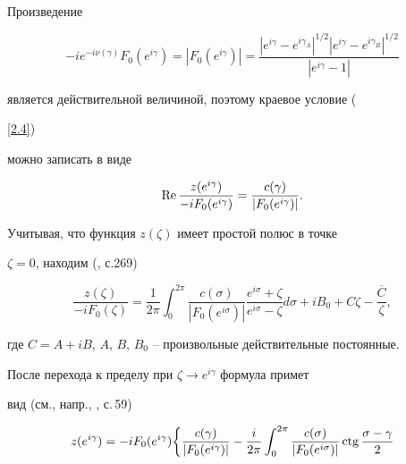 $$


 


Произведение


\begin{equation}\label{4.2}


-ie^{-i\nu(\gamma)}F_{0}(e^{i\gamma})=|F_{0}(e^{i\gamma})|=


\frac{|e^{i\gamma}-e^{i\gamma_{A}}|^{1/2}|e^{i\gamma}-


e^{i\gamma_{B}}|^{1/2}}{|e^{i\gamma}-1|}


\end{equation}


является действительной величиной, поэтому краевое условие ({\ref{2.4})


можно записать в виде


$$


\re\frac{z(e^{i\gamma})}{-iF_{0}(e^{i\gamma})}=


\frac{c(\gamma)}{|F_{0}(e^{i\gamma})|}.


$$





Учитывая, что функция $z(\zeta)$ имеет простой полюс в точке


$\zeta =0$, находим (\cite{Ga}, с.269)


\begin{equation}\label{4.4}


\frac{z(\zeta)}{-iF_{0}(\zeta)}=\frac{1}{2\pi}\int_{0}^{2\pi}


\frac{c(\sigma)}{|F_{0}(e^{i\sigma})|}\frac{e^{i\sigma}+


\zeta}{e^{i\sigma}-\zeta}d\sigma + iB_{0} + C\zeta -


\frac{\overline{C}}{\zeta},


\end{equation}


где $C=A + iB$, $A$, $B$, $B_{0}$ -- произвольные действительные постоянные.


После перехода к пределу при $\zeta\to e^{i\gamma}$ формула примет


вид (см., напр., \cite{Ga}, с.\,59)


\begin{equation}\label{4.5}


z(e^{i\gamma})=-iF_{0}(e^{i\gamma})\bigg\{\frac{c(\gamma)}


{|F_{0}(e^{i\gamma})|}-\frac{i}{2\pi}\int_{0}^{2\pi}


\frac{c(\sigma)}{|F_{0}(e^{i\sigma})|}\ctg \frac{\sigma-\gamma}{2}



\end{equation}}
